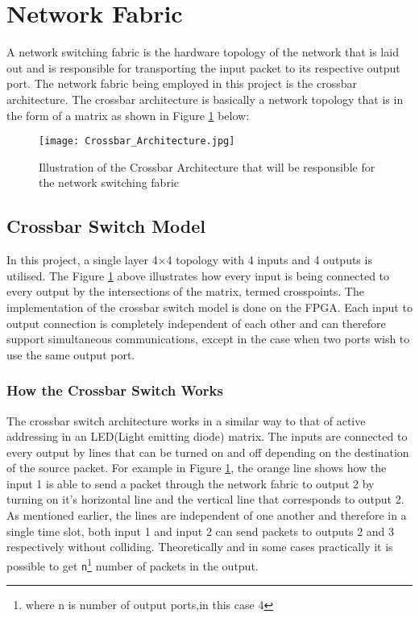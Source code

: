 \documentclass[twoside,12pt,fleqn]{book} %
\begin{document}
\section{Network Fabric}
A network switching fabric is the hardware topology of the network that is laid out and is responsible for transporting the input packet to its respective output port. The network fabric being employed in this project is the crossbar architecture. The crossbar architecture is basically a network topology that is in the form of a matrix as shown in Figure \ref{fig:crossbar_illustration} below: 
    \begin{figure}[ht]
        \centering
        \texttt{[image: Crossbar\_Architecture.jpg]}
        \caption{Illustration of the Crossbar Architecture that will be responsible for the network switching fabric}
        \label{fig:crossbar_illustration}
    \end{figure}

\subsection{Crossbar Switch Model}
In this project, a single layer 4$\times$4 topology with 4 inputs and 4 outputs is utilised. The Figure \ref{fig:crossbar_illustration} above illustrates how every input is being connected to every output by the intersections of the matrix, termed crosspoints. The implementation of the crossbar switch model is done on the FPGA. Each input to output connection is completely independent of each other and can therefore support simultaneous communications, except in the case when two ports wish to use the same output port. 

\subsubsection{How the Crossbar Switch Works}
The crossbar switch architecture works in a similar way to that of active addressing in an LED(Light emitting diode) matrix. The inputs are connected to every output by lines that can be turned on and off depending on the destination of the source packet. For example in Figure \ref{fig:crossbar_illustration}, the orange line shows how the input 1 is able to send a packet through the network fabric to output 2 by turning on it's horizontal line and the vertical line that corresponds to output 2. As mentioned earlier, the lines are independent of one another and therefore in a single time slot, both input 1 and input 2 can send packets to outputs 2 and 3 respectively without colliding. Theoretically and in some cases practically it is possible to get \texttt{n}\footnote{where n is number of output ports,in this case 4} number of packets in the output.
\end{document}
